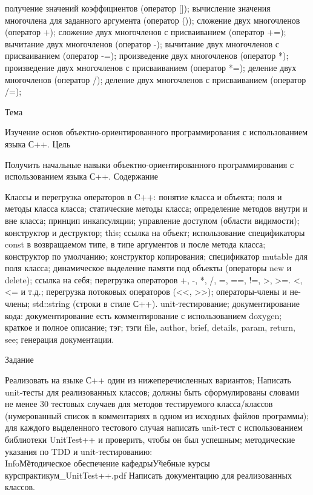 \documentclass[a4paper,12pt]{article}
\begin{document}
получение значений коэффициентов (оператор []);
вычисление значения многочлена для заданного аргумента (оператор ());
сложение двух многочленов (оператор +);
сложение двух многочленов с присваиванием (оператор +=);
вычитание двух многочленов (оператор -);
вычитание двух многочленов с присваиванием (оператор -=);
произведение двух многочленов (оператор *);
произведение двух многочленов с присваиванием (оператор *=);
деление двух многочленов (оператор /);
деление двух многочленов с присваиванием (оператор /=); 



Тема

Изучение основ объектно-ориентированного программирования с использованием языка С++.
Цель

Получить начальные навыки объектно-ориентированного программирования с использованием языка С++.
Содержание

Классы и перегрузка операторов в C++:
понятие класса и объекта;
поля и методы класса класса;
статические методы класса;
определение методов внутри и вне класса;
принцип инкапсуляции;
управление доступом (области видимости);
конструктор и деструктор;
this;
ссылка на объект;
использование спецификаторы const в возвращаемом типе, в типе аргументов и после метода класса;
конструктор по умолчанию;
конструктор копирования;
спецификатор mutable для поля класса;
динамическое выделение памяти под объекты (операторы new и delete);
ссылка на себя;
перегрузка операторов +, -, *, /, =, ==, !=, >, >=. <, <= и т.д.;
перегрузка потоковых операторов (<<, >>);
операторы-члены и не-члены;
std::string (строки в стиле С++). 
unit-тестирование;
документирование кода:
документирование есть комментирование с использованием doxygen;
краткое и полное описание;
тэг;
тэги file, author, brief, details, param, return, see;
генерация документации. 

Задание

Реализовать на языке С++ один из нижеперечисленных вариантов;
Написать unit-тесты для реализованных классов;
должны быть сформулированы словами не менее 30 тестовых случаев для методов тестируемого класса/классов (нумерованный список в комментариях в одном из исходных файлов программы);
для каждого выделенного тестового случая написать unit-тест с использованием библиотеки UnitTest++ и проверить, чтобы он был успешным;
методические указания по TDD и unit-тестированию: \\Info\StudInfo\~Методическое обеспечение кафедры\~Учебные курсы\2 курс практикум\TDD_UnitTest++.pdf 
Написать документацию для реализованных классов. 
\end{document}
